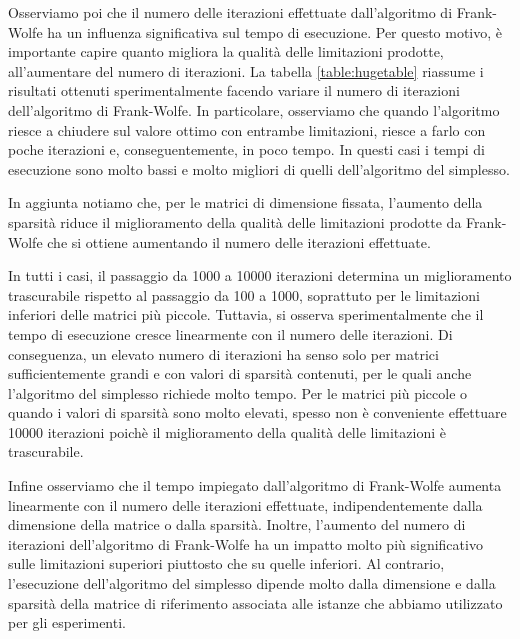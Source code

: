 Osserviamo poi che il numero delle iterazioni effettuate dall'algoritmo di Frank-Wolfe ha un influenza significativa sul
tempo di esecuzione. Per questo motivo, è importante capire quanto migliora la qualità delle limitazioni prodotte,
all'aumentare del numero di iterazioni. La tabella \ref{table:hugetable} riassume i risultati ottenuti sperimentalmente
facendo variare il numero di iterazioni dell'algoritmo di Frank-Wolfe. In particolare, osserviamo che quando l'algoritmo
riesce a chiudere sul valore ottimo con entrambe limitazioni, riesce a farlo con poche iterazioni e, conseguentemente,
in poco tempo. In questi casi i tempi di esecuzione sono molto bassi e molto migliori di quelli dell'algoritmo del
simplesso.

In aggiunta notiamo che, per le matrici di dimensione fissata, l'aumento della sparsità riduce il miglioramento della
qualità delle limitazioni prodotte da Frank-Wolfe che si ottiene aumentando il numero delle iterazioni effettuate.

In tutti i casi, il passaggio da 1000 a 10000 iterazioni determina un miglioramento trascurabile rispetto al passaggio
da 100 a 1000, soprattuto per le limitazioni inferiori delle matrici più piccole. Tuttavia, si osserva sperimentalmente
che il tempo di esecuzione cresce linearmente con il numero delle iterazioni. Di conseguenza, un elevato numero di
iterazioni ha senso solo per matrici sufficientemente grandi e con valori di sparsità contenuti, per le quali anche
l'algoritmo del simplesso richiede molto tempo. Per le matrici più piccole o quando i valori di sparsità sono molto
elevati, spesso non è conveniente effettuare 10000 iterazioni poichè il miglioramento della qualità delle limitazioni è
trascurabile.

Infine osserviamo che il tempo impiegato dall'algoritmo di Frank-Wolfe aumenta linearmente con il numero delle
iterazioni effettuate, indipendentemente dalla dimensione della matrice o dalla sparsità.  Inoltre, l'aumento del numero
di iterazioni dell'algoritmo di Frank-Wolfe ha un impatto molto più significativo sulle limitazioni superiori piuttosto
che su quelle inferiori. Al contrario, l'esecuzione dell'algoritmo del simplesso dipende molto dalla dimensione e dalla
sparsità della matrice di riferimento associata alle istanze che abbiamo utilizzato per gli esperimenti.


